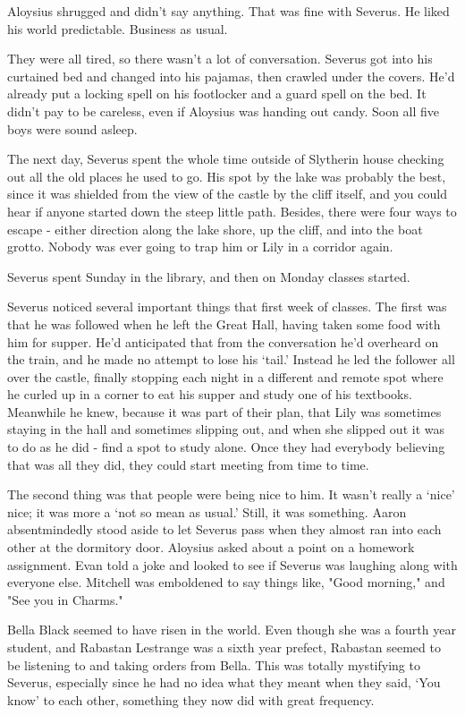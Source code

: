 Aloysius shrugged and didn't say anything. That was fine with Severus. He liked his world predictable. Business as usual.

They were all tired, so there wasn't a lot of conversation. Severus got into his curtained bed and changed into his pajamas, then crawled under the covers. He'd already put a locking spell on his footlocker and a guard spell on the bed. It didn't pay to be careless, even if Aloysius was handing out candy. Soon all five boys were sound asleep.

The next day, Severus spent the whole time outside of Slytherin house checking out all the old places he used to go. His spot by the lake was probably the best, since it was shielded from the view of the castle by the cliff itself, and you could hear if anyone started down the steep little path. Besides, there were four ways to escape - either direction along the lake shore, up the cliff, and into the boat grotto. Nobody was ever going to trap him or Lily in a corridor again.

Severus spent Sunday in the library, and then on Monday classes started.

Severus noticed several important things that first week of classes. The first was that he was followed when he left the Great Hall, having taken some food with him for supper. He'd anticipated that from the conversation he'd overheard on the train, and he made no attempt to lose his `tail.' Instead he led the follower all over the castle, finally stopping each night in a different and remote spot where he curled up in a corner to eat his supper and study one of his textbooks. Meanwhile he knew, because it was part of their plan, that Lily was sometimes staying in the hall and sometimes slipping out, and when she slipped out it was to do as he did - find a spot to study alone. Once they had everybody believing that was all they did, they could start meeting from time to time.

The second thing was that people were being nice to him. It wasn't really a `nice' nice; it was more a `not so mean as usual.' Still, it was something. Aaron absentmindedly stood aside to let Severus pass when they almost ran into each other at the dormitory door. Aloysius asked about a point on a homework assignment. Evan told a joke and looked to see if Severus was laughing along with everyone else. Mitchell was emboldened to say things like, "Good morning," and "See you in Charms."

Bella Black seemed to have risen in the world. Even though she was a fourth year student, and Rabastan Lestrange was a sixth year prefect, Rabastan seemed to be listening to and taking orders from Bella. This was totally mystifying to Severus, especially since he had no idea what they meant when they said, `You know{\el}' to each other, something they now did with great frequency.

